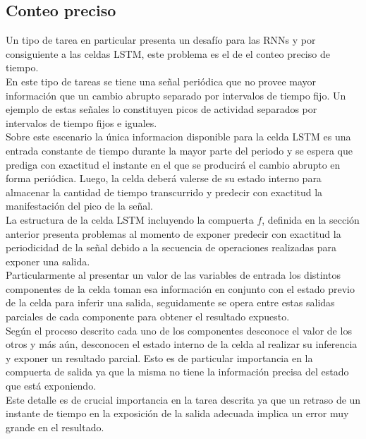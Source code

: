 \documentclass{article}
\begin{document}
	
	\subsection{Conteo preciso}
	Un tipo de tarea en particular presenta un desafío para las RNNs y por consiguiente a las celdas LSTM, este problema es el de el conteo preciso de tiempo.\\
	En este tipo de tareas se tiene una señal periódica que no provee mayor información que un cambio abrupto separado por intervalos de tiempo fijo. Un ejemplo de estas señales lo constituyen picos de actividad separados por intervalos de tiempo fijos e iguales.\\
	Sobre este escenario la única informacion disponible para la celda LSTM es una entrada constante de tiempo durante la mayor parte del periodo y se espera que prediga con exactitud el instante en el que se producirá el cambio abrupto en forma periódica. Luego, la celda deberá valerse de su estado interno para almacenar la cantidad de tiempo transcurrido y predecir con exactitud la manifestación del pico de la señal.\\
	
	La estructura de la celda LSTM incluyendo la compuerta $f$, definida en la sección anterior presenta problemas al momento de exponer predecir con exactitud la periodicidad de la señal debido a la secuencia de operaciones realizadas para exponer una salida.\\
	Particularmente al presentar un valor de las variables de entrada los distintos componentes de la celda toman esa información en conjunto con el estado previo de la celda para inferir una salida, seguidamente se opera entre estas salidas parciales de cada componente para obtener el resultado expuesto.\\
	Según el proceso descrito cada uno de los componentes desconoce el valor de los otros y más aún, desconocen el estado interno de la celda al realizar su inferencia y exponer un resultado parcial. Esto es de particular importancia en la compuerta de salida ya que la misma no tiene la información precisa del estado que está exponiendo.\\
	Este detalle es de crucial importancia en la tarea descrita ya que un retraso de un instante de tiempo en la exposición de la salida adecuada implica un error muy grande en el resultado.\\
	
\end{document}
